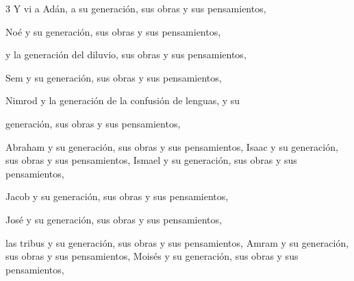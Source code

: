 \par 3 Y vi a Adán, a su generación, sus obras y sus pensamientos,
\par Noé y su generación, sus obras y sus pensamientos,
\par y la generación del diluvio, sus obras y sus pensamientos,
\par Sem y su generación, sus obras y sus pensamientos,
\par Nimrod y la generación de la confusión de lenguas, y su
\par generación, sus obras y sus pensamientos,
\par Abraham y su generación, sus obras y sus pensamientos,
Isaac y su generación, sus obras y sus pensamientos,
Ismael y su generación, sus obras y sus pensamientos,
\par Jacob y su generación, sus obras y sus pensamientos,
\par José y su generación, sus obras y sus pensamientos,
\par las tribus y su generación, sus obras y sus pensamientos,
Amram y su generación, sus obras y sus pensamientos,
Moisés y su generación, sus obras y sus pensamientos,

